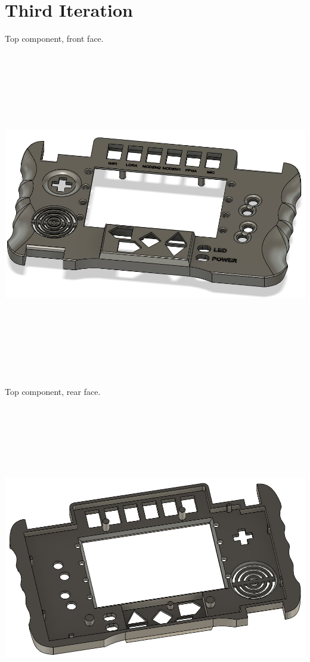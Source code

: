 \section{Third Iteration}
Top component, front face. \newline
\includegraphics[width=15cm,height=15cm,keepaspectratio]{Figures/iteration3_top_front.png} \newline
Top component, rear face. \newline
\includegraphics[width=15cm,height=15cm,keepaspectratio]{Figures/iteration3_top_back.png}
\newpage

